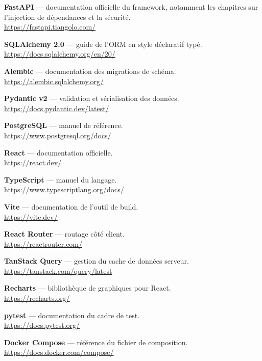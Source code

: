 \begin{enumerate}[label={[\arabic*]}, leftmargin=*, itemsep=5pt]
  \item \textbf{FastAPI} — documentation officielle du framework, notamment les
    chapitres sur l'injection de dépendances et la sécurité.\\
    \url{https://fastapi.tiangolo.com/}

  \item \textbf{SQLAlchemy 2.0} — guide de l'ORM en style déclaratif typé.\\
    \url{https://docs.sqlalchemy.org/en/20/}

  \item \textbf{Alembic} — documentation des migrations de schéma.\\
    \url{https://alembic.sqlalchemy.org/}

  \item \textbf{Pydantic v2} — validation et sérialisation des données.\\
    \url{https://docs.pydantic.dev/latest/}

  \item \textbf{PostgreSQL} — manuel de référence.\\
    \url{https://www.postgresql.org/docs/}

  \item \textbf{React} — documentation officielle.\\
    \url{https://react.dev/}

  \item \textbf{TypeScript} — manuel du langage.\\
    \url{https://www.typescriptlang.org/docs/}

  \item \textbf{Vite} — documentation de l'outil de build.\\
    \url{https://vite.dev/}

  \item \textbf{React Router} — routage côté client.\\
    \url{https://reactrouter.com/}

  \item \textbf{TanStack Query} — gestion du cache de données serveur.\\
    \url{https://tanstack.com/query/latest}

  \item \textbf{Recharts} — bibliothèque de graphiques pour React.\\
    \url{https://recharts.org/}

  \item \textbf{pytest} — documentation du cadre de test.\\
    \url{https://docs.pytest.org/}

  \item \textbf{Docker Compose} — référence du fichier de composition.\\
    \url{https://docs.docker.com/compose/}
\end{enumerate}

